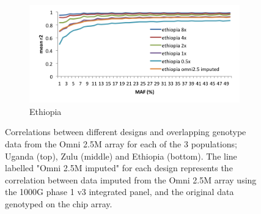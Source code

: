 \begin{figure}
        \begin{subfigure}[b]{0.75\textwidth}
                \includegraphics[width=\textwidth]{fig/SN12f5c}
                \caption{Ethiopia}
        \end{subfigure}
        \caption[Correlation with imputed chip data and sequence data after downsampling to lower coverage.]{Correlations between different designs and overlapping genotype data from the Omni 2.5M array for each of the 3 populations; Uganda (top), Zulu (middle) and Ethiopia (bottom). The line labelled "Omni 2.5M imputed" for each design represents the correlation between data imputed from the Omni 2.5M array using the \gls{1000G} phase 1 v3 integrated panel, and the original data genotyped on the chip array.}
        \label{fig:SN12f5}
\end{figure}